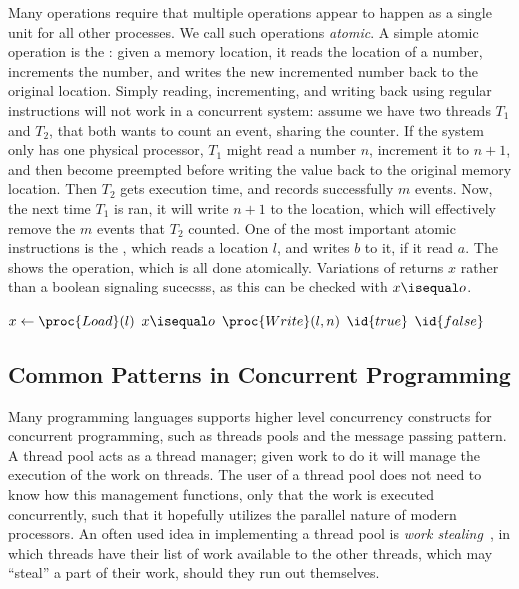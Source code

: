 Many operations require that multiple operations appear to happen as a single unit for all other
processes. We call such operations \emph{atomic}. A simple atomic operation is the
: given a memory location, it reads the location of a number, increments the
number, and writes the new incremented number back to the original location.  Simply reading,
incrementing, and writing back using regular instructions will not work in a concurrent system:
assume we have two threads $T_1$ and $T_2$, that both wants to count an event, sharing the counter.
If the system only has one physical processor, $T_1$ might read a number $n$, increment it to
$n+1$, and then become preempted before writing the value back to the original memory location.
Then $T_2$ gets execution time, and records successfully $m$ events. Now, the next time $T_1$ is
ran, it will write $n+1$ to the location, which will effectively remove the $m$ events that $T_2$
counted. One of the most important atomic instructions is the ,
which reads a location $l$, and writes $b$ to it, if it read $a$. The  shows the
operation, which is all done atomically. Variations of  returns $x$ rather than a boolean
signaling sucecsss, as this can be checked with $x \isequal o$.

\begin{codebox}
  \li $x \gets \proc{Load}(l)$
  \li \If $x \isequal o$ 
  \Then
    \li $\proc{Write}(l, n)$
    \li \Return $\id{true}$
  \li \Else
    \li \Return $\id{false}$
  \End
\end{codebox}

\subsection{Common Patterns in Concurrent Programming\label{sec:common-patterns}}

Many programming languages supports higher level concurrency constructs for concurrent programming,
such as threads pools and the message passing pattern. A thread pool acts as a thread manager;
given work to do it will manage the execution of the work on threads. The user of a thread pool
does not need to know how this management functions, only that the work is executed concurrently,
such that it hopefully utilizes the parallel nature of modern processors.  An often used idea in
implementing a thread pool is \emph{work stealing}~\cite{blumofe1999scheduling}, in which threads
have their list of work available to the other threads, which may ``steal'' a part of their work,
should they run out themselves.

